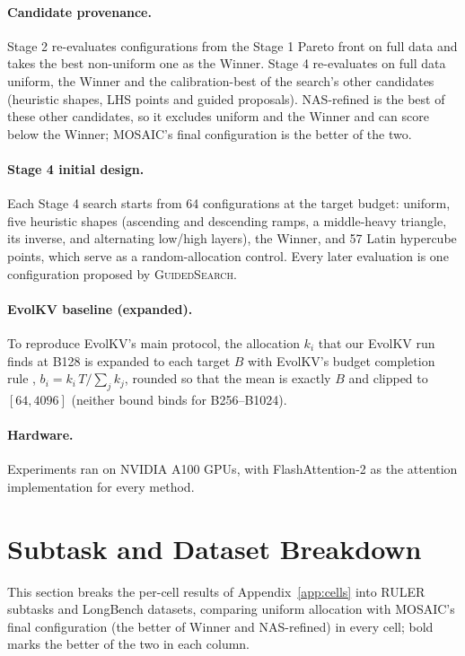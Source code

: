 \paragraph{Candidate provenance.} Stage 2 re-evaluates configurations from the Stage 1 Pareto front on full data and takes the best non-uniform one as the Winner. Stage 4 re-evaluates on full data uniform, the Winner and the calibration-best of the search's other candidates (heuristic shapes, LHS points and guided proposals). NAS-refined is the best of these other candidates, so it excludes uniform and the Winner and can score below the Winner; MOSAIC's final configuration is the better of the two.

\paragraph{Stage 4 initial design.} Each Stage 4 search starts from 64 configurations at the target budget: uniform, five heuristic shapes (ascending and descending ramps, a middle-heavy triangle, its inverse, and alternating low/high layers), the Winner, and 57 Latin hypercube points, which serve as a random-allocation control. Every later evaluation is one configuration proposed by \textsc{GuidedSearch}.

\paragraph{EvolKV baseline (expanded).} To reproduce EvolKV's main protocol, the allocation $k_i$ that our EvolKV run finds at B128 is expanded to each target $B$ with EvolKV's budget completion rule \citep{yu2025evolkv}, $b_i = k_i\,T / \sum_j k_j$, rounded so that the mean is exactly $B$ and clipped to $[64, 4096]$ (neither bound binds for B256--B1024).

\paragraph{Hardware.} Experiments ran on NVIDIA A100 GPUs, with FlashAttention-2 \citep{dao2024flashattention2} as the attention implementation for every method.


\section{Subtask and Dataset Breakdown}
\label{app:breakdown}

This section breaks the per-cell results of Appendix~\ref{app:cells} into RULER subtasks and LongBench datasets, comparing uniform allocation with MOSAIC's final configuration (the better of Winner and NAS-refined) in every cell; bold marks the better of the two in each column.


